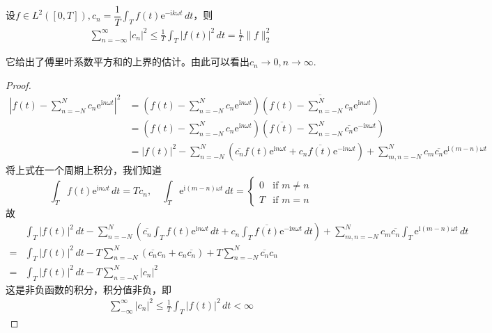 \begin{lemma}[贝塞尔不等式]\label{lemma:bessel_inequality}
设$ f\in L^2([0,T]),c_n=\dfrac{1}{T}\int_{T}f(t)\mathrm{e}^{-\mathrm{i}k\omega t}\,dt$，则
\begin{align*}
    \sum_{n=-\infty}^{\infty}|c_n|^2\leq \frac{1}{T}\int_{T}|f(t)|^2\,dt=\frac{1}{T}\|f\|_2^2
\end{align*}
\end{lemma}
它给出了傅里叶系数平方和的上界的估计。由此可以看出$c_n\to 0,n\to\infty$.
\begin{proof}
    \begin{align*}
    \left|f(t)-\sum_{n=-N}^{N}c_n \mathrm{e}^{\mathrm{i}n\omega t}\right|^2 & =\left(f(t)-\sum_{n=-N}^{N}c_n \mathrm{e}^{\mathrm{i}n\omega t}\right)\overline{\left(f(t)-\sum_{n=-N}^{N}c_n \mathrm{e}^{\mathrm{i}n\omega t}\right)}\\
    & =\left(f(t)-\sum_{n=-N}^{N}c_n \mathrm{e}^{\mathrm{i}n\omega t}\right)\left(\overline{f(t)}-\sum_{n=-N}^{N}\overline{c_n} \mathrm{e}^{-\mathrm{i}n\omega t}\right)\\
    & =|f(t)|^2-\sum_{n=-N}^{N}\left(\overline{c_n}f(t)\mathrm{e}^{\mathrm{i}n\omega t}+c_n \overline{f(t)}\mathrm{e}^{-\mathrm{i}n\omega t}\right)+\sum_{m,n=-N}^{N}c_m \overline{c_n}\mathrm{e}^{\mathrm{i}(m-n)\omega t}
\end{align*}
将上式在一个周期上积分，我们知道
\[\int_{T}f(t)\mathrm{e}^{\mathrm{i}n\omega t}\,dt=Tc_n,\quad \int_{T}\mathrm{e}^{\mathrm{i}(m-n)\omega t}\,dt=\begin{cases}
        0 & \text{if }m\neq n \\
        T & \text{if }m=n
    \end{cases}\]
故\begin{align*}
      & \int_{T}|f(t)|^2\,dt-\sum_{n=-N}^{N}\left(\overline{c_n}\int_{T}f(t)\mathrm{e}^{\mathrm{i}n\omega t}\,dt+c_n \int_{T}\overline{f(t)}\mathrm{e}^{-\mathrm{i}n\omega t}\,dt\right)+\sum_{m,n=-N}^{N}c_m \overline{c_n}\int_{T}\mathrm{e}^{\mathrm{i}(m-n)\omega t}\,dt \\
    = & \int_{T}|f(t)|^2\,dt-T\sum_{n=-N}^{N}(\overline{c_n} c_n+c_n \overline{c_n})+T\sum_{n=-N}^{N}\overline{c_n} c_n\\
    = & \int_{T}|f(t)|^2\,dt-T\sum_{n=-N}^{N}|c_n|^2
\end{align*}
这是非负函数的积分，积分值非负，即\begin{align*}
    \sum_{-\infty}^{\infty}|c_n|^2\leq \frac{1}{T}\int_{T}|f(t)|^2\,dt<\infty
\end{align*}
\end{proof}

